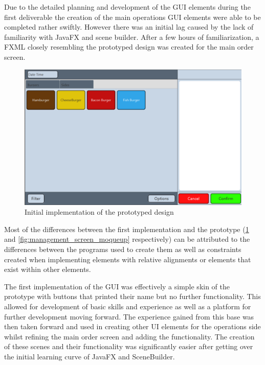 
Due to the detailed planning and development of the GUI elements during the first deliverable the creation of the main operations GUI elements were able to be completed rather swiftly. However there was an initial lag caused by the lack of familiarity with JavaFX and scene builder. After a few hours of familiarization, a FXML closely resembling the prototyped design was created for the main order screen.

\begin{figure}[H]
	\centering
	\includegraphics[width=150mm]{images/old_order_screen.png}
	\caption{Initial implementation of the prototyped design}
	\label{fig:old_order_screen}
\end{figure}

Most of the differences between the first implementation and the prototype (\ref{fig:old_order_screen} and \ref{fig:management_screen_moqueup} respectively) can be attributed to the differences between the programs used to create them as well as constraints created when implementing elements with relative alignments or elements that exist within other elements.

The first implementation of the GUI was effectively a simple skin of the prototype with buttons that printed their name but no further functionality. This allowed for development of basic skills and experience as well as a platform for further development moving forward. The experience gained from this base was then taken forward and used in creating other UI elements for the operations side whilst refining the main order screen and adding the functionality. The creation of these scenes and their functionality was significantly easier after getting over the initial learning curve of JavaFX and SceneBuilder.

